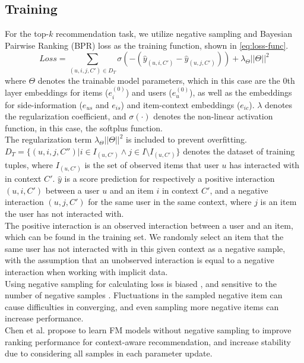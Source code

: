 \subsection{Training}\label{subsec:csgcn_is_training}
For the top-$k$ recommendation task, we utilize negative sampling and Bayesian Pairwise Ranking (BPR) loss \cite{BPR} as the training function, shown in \autoref{eq:loss-func}.
\begin{equation}\label{eq:loss-func}
    Loss = \sum_{(u,i,j,C') \in D_T} \sigma(-(\hat{y}_{(u,i,C')} - \hat{y}_{(u,j,C')})) + \lambda_\Theta ||\Theta||^2
\end{equation}
where $\Theta$ denotes the trainable model parameters, which in this case are the 0th layer embeddings for items ($e_{i}^{(0)}$) and users ($e_{u}^{(0)}$), as well as the embeddings for side-information ($e_{us}$ and $e_{is}$) and item-context embeddings ($e_{ic}$).
$\lambda$ denotes the regularization coefficient, and $\sigma(\cdot)$ denotes the non-linear activation function, in this case, the softplus function.\\
The regularization term $\lambda_\Theta ||\Theta||^2$ is included to prevent overfitting.
$D_T = \{(u,i,j,C'') | i \in I_{(u,C')} \wedge  j \in I \setminus I_{(u,C')}\}$ denotes the dataset of training tuples, where $I_{(u,C')}$ is the set of observed items that user $u$ has interacted with in context $C'$.
$\hat{y}$ is a score prediction for respectively a positive interaction $(u,i,C')$ between a user $u$ and an item $i$ in context $C'$, and a negative interaction $(u,j,C')$ for the same user in the same context, where $j$ is an item the user has not interacted with.\\
The positive interaction is an observed interaction between a user and an item, which can be found in the training set.
We randomly select an item that the same user has not interacted with in this given context as a negative sample, with the assumption that an unobserved interaction is equal to a negative interaction when working with implicit data.\\
Using negative sampling for calculating loss is biased \cite{nonsampling,NegativeSampling}, and sensitive to the number of negative samples \cite{NCF}.
Fluctuations in the sampled negative item can cause difficulties in converging, and even sampling more negative items can increase performance.\\
Chen et al. \cite{nonsampling} propose to learn FM models without negative sampling to improve ranking performance for context-aware recommendation, and increase stability due to considering all samples in each parameter update.
